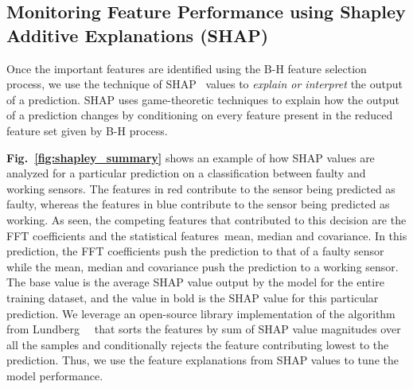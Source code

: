%

\subsection{Monitoring Feature Performance using Shapley Additive Explanations (SHAP)} \label{subsec:shap} Once the important features are identified using the B-H feature selection process, we use the technique of SHAP~\cite{NIPS2017_8a20a862} values to \textit{explain or interpret} the output of a prediction. SHAP uses game-theoretic techniques to explain how the output of a prediction changes by conditioning on every feature present in the reduced feature set given by B-H process.  




{\bfseries Fig.~\ref{fig:shapley_summary}} shows an example of how SHAP values are analyzed for a particular prediction on a classification between faulty and working sensors. The features in red contribute to the sensor being predicted as faulty, whereas the features in blue contribute to the sensor being predicted as working. As seen, the competing features that contributed to this decision are the FFT coefficients and the statistical features~\viz mean, median and covariance. 
In this prediction, the FFT coefficients push the prediction to that of a faulty sensor while the mean, median and covariance push the prediction to a working sensor. The base value is the average SHAP value output by the model for the entire training dataset, and the value in bold is the SHAP value for this particular prediction. We leverage an open-source library implementation of the algorithm from Lundberg~\etal~\cite{NIPS2017_8a20a862, shap_implementation} that sorts the features by sum of SHAP value magnitudes over all the samples and conditionally rejects the feature contributing lowest to the prediction. Thus, we use the feature explanations from SHAP values to tune the model performance. %

